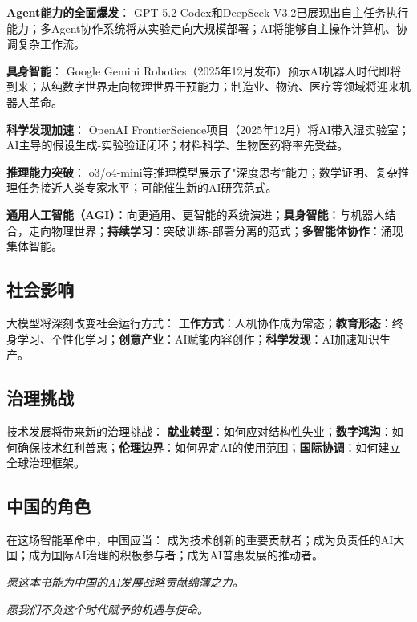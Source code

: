 \textbf{Agent能力的全面爆发}：
GPT-5.2-Codex和DeepSeek-V3.2已展现出自主任务执行能力；多Agent协作系统将从实验走向大规模部署；AI将能够自主操作计算机、协调复杂工作流。

\textbf{具身智能}：
Google Gemini Robotics（2025年12月发布）预示AI机器人时代即将到来；从纯数字世界走向物理世界干预能力；制造业、物流、医疗等领域将迎来机器人革命。

\textbf{科学发现加速}：
OpenAI FrontierScience项目（2025年12月）将AI带入湿实验室；AI主导的假设生成-实验验证闭环；材料科学、生物医药将率先受益。

\textbf{推理能力突破}：
o3/o4-mini等推理模型展示了"深度思考"能力；数学证明、复杂推理任务接近人类专家水平；可能催生新的AI研究范式。

\textbf{通用人工智能（AGI）}：向更通用、更智能的系统演进；\textbf{具身智能}：与机器人结合，走向物理世界；\textbf{持续学习}：突破训练-部署分离的范式；\textbf{多智能体协作}：涌现集体智能。

\subsection{社会影响}

大模型将深刻改变社会运行方式：
\textbf{工作方式}：人机协作成为常态；\textbf{教育形态}：终身学习、个性化学习；\textbf{创意产业}：AI赋能内容创作；\textbf{科学发现}：AI加速知识生产。

\subsection{治理挑战}

技术发展将带来新的治理挑战：
\textbf{就业转型}：如何应对结构性失业；\textbf{数字鸿沟}：如何确保技术红利普惠；\textbf{伦理边界}：如何界定AI的使用范围；\textbf{国际协调}：如何建立全球治理框架。

\subsection{中国的角色}

在这场智能革命中，中国应当：
成为技术创新的重要贡献者；成为负责任的AI大国；成为国际AI治理的积极参与者；成为AI普惠发展的推动者。

\begin{center}
\textit{愿这本书能为中国的AI发展战略贡献绵薄之力。}

\textit{愿我们不负这个时代赋予的机遇与使命。}
\end{center}
